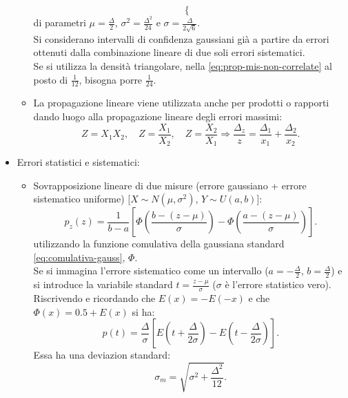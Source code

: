 \begin{itemize}
\begin{itemize}
\begin{equation}
\begin{cases}
\end{cases}
\end{equation}
di parametri $\mu=\frac{\Delta}{2}$, $\sigma^2=\frac{\Delta^2}{24}$ e $\sigma=\frac{\Delta}{2\sqrt{6}}$. \\ Si considerano intervalli di confidenza gaussiani già a partire da errori ottenuti dalla combinazione lineare di due soli errori sistematici. \\ Se si utilizza la densità triangolare, nella \ref{eq:prop-mis-non-correlate} al posto di $\frac{1}{12}$, bisogna porre $\frac{1}{24}$.
\item La propagazione lineare viene utilizzata anche per prodotti o rapporti dando luogo alla propagazione lineare degli errori massimi:
\begin{equation}
Z=X_{ 1 }X_{ 2 },\quad Z=\frac { X_{ 1 } }{ X_{ 2 } } ,\quad Z=\frac { X_{ 2 } }{ X_{ 1 } } \Longrightarrow \frac { { \Delta  }_{ z } }{ z } =\frac { { \Delta  }_{ 1 } }{ { x }_{ 1 } } +\frac { { \Delta  }_{ 2 } }{ { x }_{ 2 } } .
\end{equation}
\end{itemize}
\item Errori statistici e sistematici:
\begin{itemize}
\item Sovrapposizione lineare di due misure (errore gaussiano + errore sistematico uniforme) [$X\sim N(\mu,\sigma^2)$, $Y\sim U(a,b)$]:
\begin{equation}
{ p }_{ z }\left( z \right) =\frac { 1 }{ b-a } \left[ \Phi \left( \frac { b-\left( z-\mu  \right)  }{ \sigma  }  \right) -\Phi \left( \frac { a-\left( z-\mu  \right)  }{ \sigma  }  \right)  \right] .
\end{equation}
utilizzando la funzione comulativa della gaussiana standard \ref{eq:comulativa-gauss}, $\Phi$. \\ Se si immagina l'errore sistematico come un intervallo ($a=-\frac{\Delta}{2}$, $b=\frac{\Delta}{2}$) e si introduce la variabile standard $t=\frac{z-\mu}{\sigma}$ ($\sigma$ è l'errore statistico vero). Riscrivendo e ricordando che $E(x)=-E(-x)$ e che $\Phi(x)=0.5+E(x)$ si ha:
\begin{equation}
p\left( t \right) =\frac { \Delta  }{ \sigma  } \left[ E\left( t+\frac { \Delta  }{ 2\sigma  }  \right) -E\left( t-\frac { \Delta  }{ 2\sigma  }  \right)  \right] .
\end{equation}
Essa ha una deviazion standard:
\begin{equation}
{ \sigma  }_{ m }=\sqrt { { { \sigma  } }^{ 2 }+\frac { { \Delta  }^{ 2 } }{ 12 }  } .
\end{equation}
\end{itemize}
\end{itemize}

